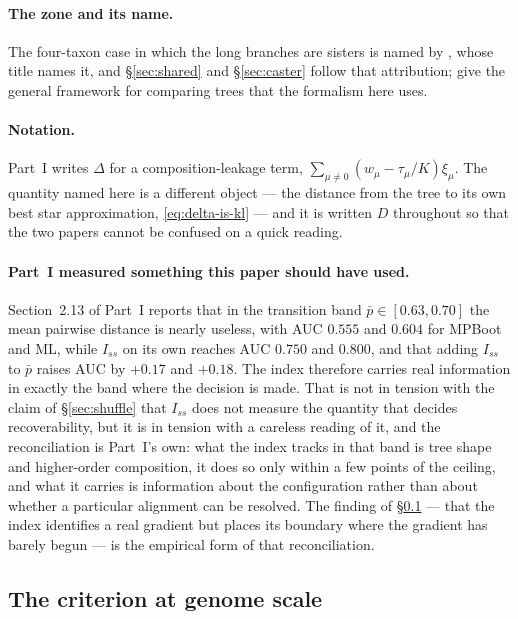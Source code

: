 \documentclass[preprint,12pt,authoryear]{elsarticle}
\newcommand{\Iss}{I_{ss}}
\theoremstyle{definition}
\theoremstyle{remark}
\begin{document}
\paragraph{The zone and its name.} The four-taxon case in which the long
branches are sisters is named by \citet{siddall1998}, whose title names it,
and \S\ref{sec:shared} and \S\ref{sec:caster} follow that attribution;
\citet{hendy1989} give the general framework for comparing trees that the
formalism here uses.

\paragraph{Notation.} Part~I writes $\Delta$ for a composition-leakage term,
$\sum_{\mu\ne0}(w_\mu-\tau_\mu/K)\xi_\mu$. The quantity named here is a
different object --- the distance from the tree to its own best star
approximation, \eqref{eq:delta-is-kl} --- and it is written $D$ throughout so
that the two papers cannot be confused on a quick reading.

\paragraph{Part~I measured something this paper should have used.}
Section~2.13 of Part~I reports that in the transition band
$\bar p\in[0.63,0.70]$ the mean pairwise distance is nearly useless, with AUC
$0.555$ and $0.604$ for MPBoot and ML, while $\Iss$ on its own reaches AUC
$0.750$ and $0.800$, and that adding $\Iss$ to $\bar p$ raises AUC by $+0.17$
and $+0.18$. The index therefore carries real information in exactly the band
where the decision is made. That is not in tension with the claim of
\S\ref{sec:shuffle} that $\Iss$ does not measure the quantity that decides
recoverability, but it is in tension with a careless reading of it, and the
reconciliation is Part~I's own: what the index tracks in that band is tree
shape and higher-order composition, it does so only within a few points of the
ceiling, and what it carries is information about the configuration rather
than about whether a particular alignment can be resolved. The finding of
\S\ref{sec:genome} --- that the index identifies a real gradient but places
its boundary where the gradient has barely begun --- is the empirical form of
that reconciliation.

\subsection{The criterion at genome scale}
\label{sec:genome}
\end{document}
